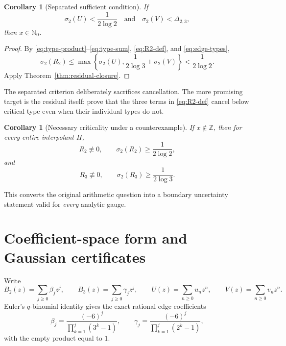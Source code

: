 \documentclass[11pt]{article}
\newtheorem{corollary}[theorem]{Corollary}
\theoremstyle{definition}
\newcommand{\Z}{\mathbb Z}
\newcommand{\Nzero}{\mathbb N_0}
\begin{document}
\begin{corollary}[Separated sufficient condition]\label{cor:separated-type}
If
\begin{equation}\label{eq:separated-condition}
  \sigma_2(U)<\frac1{2\log2}
  \quad\text{and}\quad
  \sigma_2(V)<\Delta_{2,3},
\end{equation}
then \(x\in\Nzero\).
\end{corollary}

\begin{proof}
By \eqref{eq:type-product}--\eqref{eq:type-sum}, \eqref{eq:R2-def}, and \eqref{eq:edge-types},
\[
  \sigma_2(R_2)
  \le
  \max\left\{
    \sigma_2(U),
    \frac1{2\log3}+\sigma_2(V)
  \right\}
  <\frac1{2\log2}.
\]
Apply Theorem~\ref{thm:residual-closure}.
\end{proof}

The separated criterion deliberately sacrifices cancellation.  The more promising target is the residual itself: prove that the three terms in \eqref{eq:R2-def} cancel below critical type even when their individual types do not.

\begin{corollary}[Necessary criticality under a counterexample]\label{cor:necessary-criticality}
If \(x\notin\Z\), then for every entire interpolant \(H\),
\[
  R_2\not\equiv0,
  \qquad
  \sigma_2(R_2)\ge\frac1{2\log2},
\]
and
\[
  R_3\not\equiv0,
  \qquad
  \sigma_2(R_3)\ge\frac1{2\log3}.
\]
\end{corollary}

This converts the original arithmetic question into a boundary uncertainty statement valid for \emph{every} analytic gauge.

\section{Coefficient-space form and Gaussian certificates}\label{sec:coefficients}

Write
\[
  B_2(z)=\sum_{j\ge0}\beta_jz^j,
  \qquad
  B_3(z)=\sum_{j\ge0}\gamma_jz^j,
  \qquad
  U(z)=\sum_{n\ge0}u_nz^n,
  \qquad
  V(z)=\sum_{n\ge0}v_nz^n.
\]
Euler's \(q\)-binomial identity gives the exact rational edge coefficients
\begin{equation}\label{eq:edge-coefficients}
  \beta_j=\frac{(-6)^j}{\prod_{k=1}^j(3^k-1)},
  \qquad
  \gamma_j=\frac{(-6)^j}{\prod_{k=1}^j(2^k-1)},
\end{equation}
with the empty product equal to \(1\).
\end{document}
